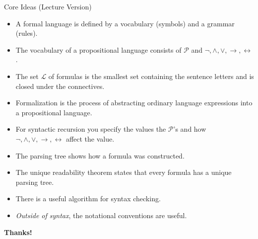 \documentclass[../slides.tex]{subfiles}
\begin{document}
\begin{frame}{Core Ideas (Lecture Version)}
 
 
 \begin{itemize}

	\item A formal language is defined by a vocabulary (symbols) and a grammar (rules).
	
	\item The vocabulary of a propositional language consists of $\mathcal{P}$ and $\neg,\land,\lor,\to,\leftrightarrow$.
	
	\item The set $\mathcal{L}$ of formulas is the smallest set containing the sentence letters and is closed under the connectives. 
	
	\item Formalization is the process of abstracting ordinary language expressions into a propositional language.
	
	\item For syntactic recursion you specify the values the $\mathcal{P}$'s and how $\neg,\land,\lor,\to,\leftrightarrow$ affect the value.
	
	\item The parsing tree shows how a formula was constructed.
	
	\item The unique readability theorem states that every formula has a unique parsing tree.
	
	\item There is a useful algorithm for syntax checking.
	
	\item \emph{Outside of syntax}, the notational conventions are useful.

\end{itemize}


\end{frame}


\begin{frame}

	\begin{center}
	{\huge\bf Thanks!}
	\end{center}

\end{frame}
\end{document}

